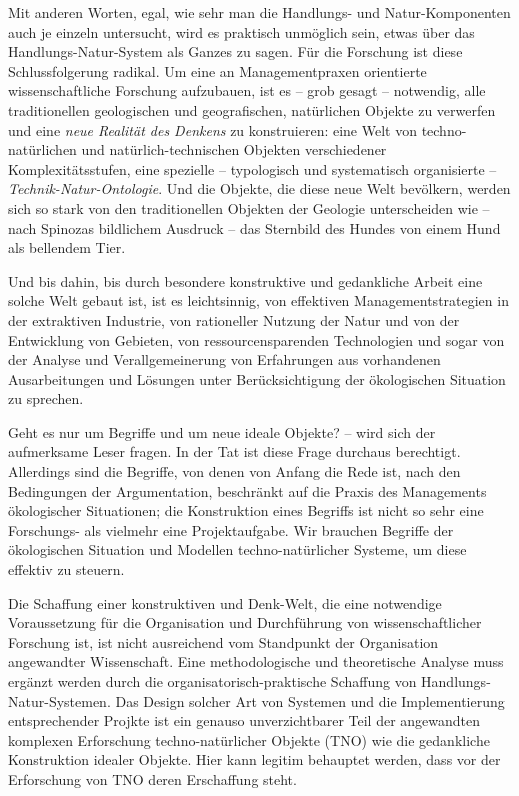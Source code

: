 \documentclass[11pt,a4paper]{article}
\begin{document}
Mit anderen Worten, egal, wie sehr man die Handlungs- und Natur-Komponenten
auch je einzeln untersucht, wird es praktisch unmöglich sein, etwas über das
Handlungs-Natur-System als Ganzes zu sagen. Für die Forschung ist diese
Schlussfolgerung radikal. Um eine an Managementpraxen orientierte
wissenschaftliche Forschung aufzubauen, ist es -- grob gesagt -- notwendig,
alle traditionellen geologischen und geografischen, natürlichen Objekte zu
verwerfen und eine \emph{neue Realität des Denkens} zu konstruieren: eine Welt
von techno-natürlichen und natürlich-technischen Objekten verschiedener
Komplexitätsstufen, eine spezielle -- typologisch und systematisch
organisierte -- \emph{Technik-Natur-Ontologie}. Und die Objekte, die diese
neue Welt bevölkern, werden sich so stark von den traditionellen Objekten der
Geologie unterscheiden wie -- nach Spinozas bildlichem Ausdruck -- das
Sternbild des Hundes von einem Hund als bellendem Tier.

Und bis dahin, bis durch besondere konstruktive und gedankliche Arbeit eine
solche Welt gebaut ist, ist es leichtsinnig, von effektiven
Managementstrategien in der extraktiven Industrie, von rationeller Nutzung der
Natur und von der Entwicklung von Gebieten, von ressourcensparenden
Technologien und sogar von der Analyse und Verallgemeinerung von Erfahrungen
aus vorhandenen Ausarbeitungen und Lösungen unter Berücksichtigung der
ökologischen Situation zu sprechen.

Geht es nur um Begriffe und um neue ideale Objekte? -- wird sich der
aufmerksame Leser fragen. In der Tat ist diese Frage durchaus berechtigt.
Allerdings sind die Begriffe, von denen von Anfang die Rede ist, nach den
Bedingungen der Argumentation, beschränkt auf die Praxis des Managements
ökologischer Situationen; die Konstruktion eines Begriffs ist nicht so sehr
eine Forschungs- als vielmehr eine Projektaufgabe. Wir brauchen Begriffe der
ökologischen Situation und Modellen techno-natürlicher Systeme, um diese
effektiv zu steuern.

Die Schaffung einer konstruktiven und Denk-Welt, die eine notwendige
Voraussetzung für die Organisation und Durchführung von wissenschaftlicher
Forschung ist, ist nicht ausreichend vom Standpunkt der Organisation
angewandter Wissenschaft. Eine methodologische und theoretische Analyse muss
ergänzt werden durch die organisatorisch-praktische Schaffung von
Handlungs-Natur-Systemen. Das Design solcher Art von Systemen und die
Implementierung entsprechender Projkte ist ein genauso unverzichtbarer Teil
der angewandten komplexen Erforschung techno-natürlicher Objekte (TNO) wie die
gedankliche Konstruktion idealer Objekte.  Hier kann legitim behauptet werden,
dass vor der Erforschung von TNO deren Erschaffung steht.
\end{document}
